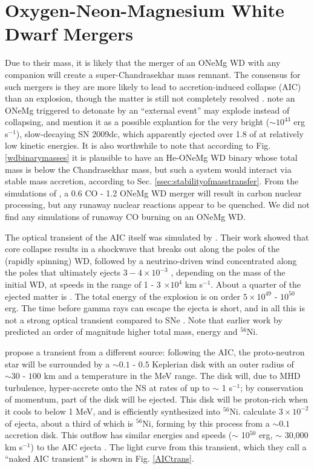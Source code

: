 \section{Oxygen-Neon-Magnesium White Dwarf Mergers}
\label{sec:onemg}

Due to their mass, it is likely that the merger of an ONeMg WD with any companion will create a super-Chandrasekhar mass remnant.  The consensus for such mergers is they are more likely to lead to accretion-induced collapse (AIC) than an explosion, though the matter is still not completely resolved \citep{yoonpr07,frye+10,dess+06}.  \cite{taub+11} note an ONeMg triggered to detonate by an ``external event'' may explode instead of collapsing, and mention it as a possible explantion for the very bright ($\sim 10^{43}$ erg s$^{-1}$), slow-decaying SN 2009dc, which apparently ejected over 1.8 {\Msun} of {\Ni} at relatively low kinetic energies.  It is also worthwhile to note that according to Fig. \ref{wdbinarymasses} it is plausible to have an He-ONeMg WD binary whose total mass is below the Chandrasekhar mass, but such a system would interact via stable mass accretion, according to Sec. \ref{ssec:stabilityofmasstransfer}.  From the simulations of \citeauthor{loreig09}, a 0.6 CO - 1.2 ONeMg WD merger will result in carbon nuclear processing, but any runaway nuclear reactions appear to be quenched.  We did not find any simulations of runaway CO burning on an ONeMg WD.

The optical transient of the AIC itself was simulated by \cite{dess+06}.  Their work showed that core collapse results in a shockwave that breaks out along the poles of the (rapidly spinning) WD, followed by a neutrino-driven wind concentrated along the poles that ultimately ejects $3 - 4 \times 10^{-3}$ {\Msun}, depending on the mass of the initial WD, at speeds in the range of 1 - 3 $\times 10^4$ km s$^{-1}$.  About a quarter of the ejected matter is {\Ni}.  The total energy of the explosion is on order $5 \times 10^{49}$ - $10^{50}$ erg.  The time before gamma rays can escape the ejecta is short, and in all this is not a strong optical transient compared to SNe \citep{metz+09}.  Note that earlier work by \cite{frye+99} predicted an order of magnitude higher total mass, energy and $^{56}$Ni.

\cite{metz+09} propose a transient from a different source: following the AIC, the proto-neutron star will be surrounded by a $\sim 0.1$ - $0.5$ {\Msun} Keplerian disk with an outer radius of $\sim30$ - $100$ km and a temperature in the MeV range.  The disk will, due to MHD turbulence, hyper-accrete onto the NS at rates of up to $\sim$ 1 {\Msun} s$^{-1}$; by conservation of momentum, part of the disk will be ejected.  This disk will be proton-rich when it cools to below 1 MeV, and is efficiently synthesized into $^{56}$Ni.  \citeauthor{metz+09} calculate $3 \times 10^{-2}$ {\Msun} of ejecta, about a third of which is $^{56}$Ni, forming by this process from a $\sim 0.1$ {\Msun} accretion disk.  This outflow has similar energies and speeds ($\sim$ 10$^{50}$ erg, $\sim$ 30,000 km s$^{-1}$) to the AIC ejecta \citep{metz+09}.  The light curve from this transient, which they call a ``naked AIC transient'' is shown in Fig. \ref{AICtrans}.

